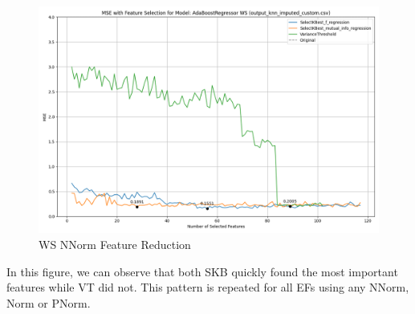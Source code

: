 \documentclass[12pt,letterpaper]{article}
\begin{document}
\begin{figure}
    \centering
    \includegraphics[width=1\linewidth]{reg_section_all/feature_selection_WS_non_norm.png}
    \caption{WS \ac{NNorm} Feature Reduction}
    \label{reg_all_fig:featred_Ex}
\end{figure}
In this figure, we can observe that both \ac{SKB} quickly found the most important features while \ac{VT} did not.
This pattern is repeated for all \ac{EFs} using any \ac{NNorm}, \ac{Norm} or \ac{PNorm}.
\end{document}
